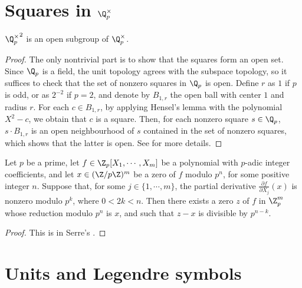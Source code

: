 \section[Squares in the p-adic units]{Squares in $\Q_p^{\times}$}\label{sec:padic_squares}

\begin{theorem}\label{thm:padic_squares_open}
\leanok
${\Q_p^\times}^2$ is an open subgroup of $\Q_p^\times$.
\end{theorem}

\begin{proof}
The only nontrivial part is to show that the squares form an open set.  Since $\Q_p$ is a field, the unit topology agrees with the subspace topology, so it suffices to check that the set of nonzero squares in $\Q_p$ is open. Define $r$ as $1$ if $p$ is odd, or as $2^{-2}$ if $p = 2$, and denote by $B_{1, r}$ the open ball with center $1$ and radius $r$. For each $c \in B_{1, r}$, by applying Hensel's lemma with the polynomial $X^2 - c$, we obtain that $c$ is a square.
Then, for each nonzero square $s \in \Q_p$, $s \cdot B_{1, r}$ is an open neighbourhood of $s$ contained in the set of nonzero squares, which shows that the latter is open.
See \cite[\S II.3.3]{Ser73} for more details.
\end{proof}

\begin{lemma}
  \label{lem:multivariable_hensel}
  \leanok
Let $p$ be a prime, let $f \in \Z_p[X_1, \cdots, X_m]$ be a polynomial with $p$-adic integer
coefficients, and let $x \in (\Z/p\Z)^m$ be a zero of $f$ modulo $p^n$, for some positive integer
$n$. Suppose that, for some $j \in \{1, \cdots, m\}$, the partial derivative
$\frac{\partial f}{\partial X_j}(x)$ is nonzero modulo $p^k$, where $0 < 2k < n$.
Then there exists a zero $z$ of $f$ in $\Z_p^m$ whose reduction modulo $p^n$ is $x$, and such that
$z-x$ is divisible by $p^{n-k}$.
\end{lemma}

\begin{proof}
This is in Serre's \cite[\S II.2 Theorem 1]{Ser73}.
\end{proof}

\section[Units and Legendre symbols]{Units and Legendre symbols}\label{sec:padic_legendre}

